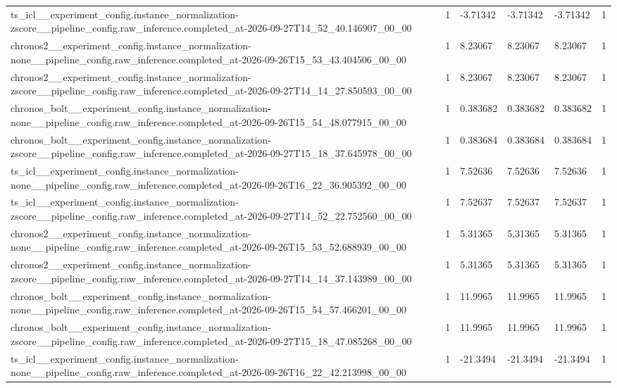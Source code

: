 \begin{tabular}{llllll}
ts\_icl\_\_experiment\_config.instance\_normalization-zscore\_\_pipeline\_config.raw\_inference.completed\_at-2026-09-27T14\_52\_40.146907\_00\_00 & 1 & -3.71342 & -3.71342 & -3.71342 & 1 \\
chronos2\_\_experiment\_config.instance\_normalization-none\_\_pipeline\_config.raw\_inference.completed\_at-2026-09-26T15\_53\_43.404506\_00\_00 & 1 & 8.23067 & 8.23067 & 8.23067 & 1 \\
chronos2\_\_experiment\_config.instance\_normalization-zscore\_\_pipeline\_config.raw\_inference.completed\_at-2026-09-27T14\_14\_27.850593\_00\_00 & 1 & 8.23067 & 8.23067 & 8.23067 & 1 \\
chronos\_bolt\_\_experiment\_config.instance\_normalization-none\_\_pipeline\_config.raw\_inference.completed\_at-2026-09-26T15\_54\_48.077915\_00\_00 & 1 & 0.383682 & 0.383682 & 0.383682 & 1 \\
chronos\_bolt\_\_experiment\_config.instance\_normalization-zscore\_\_pipeline\_config.raw\_inference.completed\_at-2026-09-27T15\_18\_37.645978\_00\_00 & 1 & 0.383684 & 0.383684 & 0.383684 & 1 \\
ts\_icl\_\_experiment\_config.instance\_normalization-none\_\_pipeline\_config.raw\_inference.completed\_at-2026-09-26T16\_22\_36.905392\_00\_00 & 1 & 7.52636 & 7.52636 & 7.52636 & 1 \\
ts\_icl\_\_experiment\_config.instance\_normalization-zscore\_\_pipeline\_config.raw\_inference.completed\_at-2026-09-27T14\_52\_22.752560\_00\_00 & 1 & 7.52637 & 7.52637 & 7.52637 & 1 \\
chronos2\_\_experiment\_config.instance\_normalization-none\_\_pipeline\_config.raw\_inference.completed\_at-2026-09-26T15\_53\_52.688939\_00\_00 & 1 & 5.31365 & 5.31365 & 5.31365 & 1 \\
chronos2\_\_experiment\_config.instance\_normalization-zscore\_\_pipeline\_config.raw\_inference.completed\_at-2026-09-27T14\_14\_37.143989\_00\_00 & 1 & 5.31365 & 5.31365 & 5.31365 & 1 \\
chronos\_bolt\_\_experiment\_config.instance\_normalization-none\_\_pipeline\_config.raw\_inference.completed\_at-2026-09-26T15\_54\_57.466201\_00\_00 & 1 & 11.9965 & 11.9965 & 11.9965 & 1 \\
chronos\_bolt\_\_experiment\_config.instance\_normalization-zscore\_\_pipeline\_config.raw\_inference.completed\_at-2026-09-27T15\_18\_47.085268\_00\_00 & 1 & 11.9965 & 11.9965 & 11.9965 & 1 \\
ts\_icl\_\_experiment\_config.instance\_normalization-none\_\_pipeline\_config.raw\_inference.completed\_at-2026-09-26T16\_22\_42.213998\_00\_00 & 1 & -21.3494 & -21.3494 & -21.3494 & 1 \\

\end{tabular}

